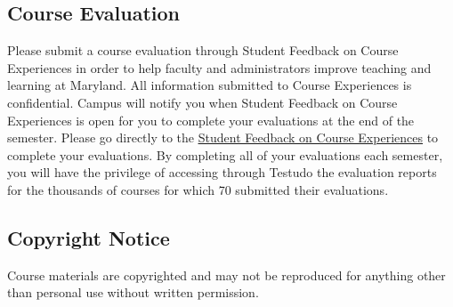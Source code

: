 \documentclass[11pt,usenames,dvipsnames,svgnames,x11names,letterpaper]{article}
\newcommand{\urllink}[2]{\href{#1}{\textcolor{Tomato3}{{{\tiny\faChevronRight}\uline{#2}}}}}
\begin{document}
\subsection{Course Evaluation}
Please submit a course evaluation through Student Feedback on Course Experiences in order to help faculty and
administrators improve teaching and learning at Maryland. All information submitted to Course Experiences is
confidential. Campus will notify you when Student Feedback on Course Experiences is open for you to complete
your evaluations at the end of the semester. Please go directly to the \urllink{https://courseexp.umd.edu/}{Student Feedback on Course Experiences} to
complete your evaluations. By completing all of your evaluations each semester, you will have the privilege of
accessing through Testudo the evaluation reports for the thousands of courses for which 70%
submitted their evaluations.

\subsection{Copyright Notice}
Course materials are copyrighted and may not be reproduced for anything other than personal use without written
permission.
\end{document}
